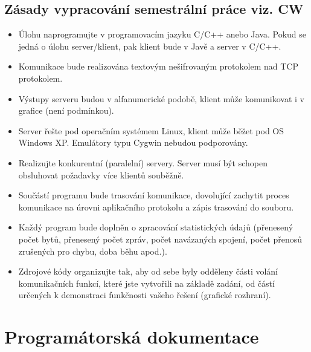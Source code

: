 \documentclass[12pt,a4paper]{article}
\let\oldsection\section
\renewcommand\section{\clearpage\oldsection}
\begin{document}
\subsection*{Zásady vypracování semestrální práce viz. CW}
\begin{itemize}
\setlength\itemsep{0em}
\item Úlohu naprogramujte v programovacím jazyku C/C++ anebo Java. Pokud se jedná o úlohu server/klient, pak klient bude v Javě a server v C/C++.

\item Komunikace bude realizována textovým nešifrovaným protokolem nad TCP protokolem.

\item Výstupy serveru budou v alfanumerické podobě, klient může komunikovat i v grafice (není podmínkou).

\item Server řešte pod operačním systémem Linux, klient může běžet pod OS Windows XP. Emulátory typu Cygwin nebudou podporovány.

\item Realizujte konkurentní (paralelní) servery. Server musí být schopen obsluhovat požadavky více klientů souběžně.

\item Součástí programu bude trasování komunikace, dovolující zachytit proces komunikace na úrovni aplikačního protokolu a zápis trasování do souboru.

\item Každý program bude doplněn o zpracování statistických údajů (přenesený počet bytů, přenesený počet zpráv, počet navázaných spojení, počet přenosů zrušených pro chybu, doba běhu apod.).

\item Zdrojové kódy organizujte tak, aby od sebe byly odděleny části volání komunikačních funkcí, které jste vytvořili na základě zadání, od částí určených k demonstraci funkčnosti vašeho řešení (grafické rozhraní).
\end{itemize}
\section{Programátorská dokumentace}
\end{document}
